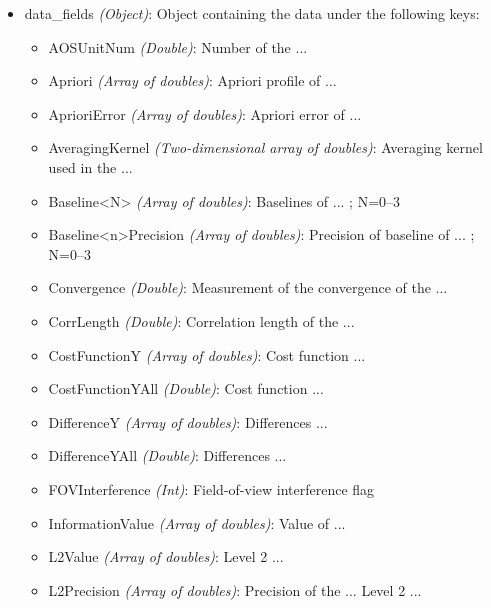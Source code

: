 \begin{itemize}
    \item data\_fields \emph{(Object)}: Object containing the data under the
        following keys:
        \begin{itemize}
            \item AOSUnitNum \emph{(Double)}: Number of the ...
            \item Apriori \emph{(Array of doubles)}: Apriori profile of ...
            \item AprioriError \emph{(Array of doubles)}: Apriori error of ...
            \item AveragingKernel \emph{(Two-dimensional array of doubles)}:
                Averaging kernel used in the ... 
            \item Baseline<N> \emph{(Array of doubles)}: Baselines of ...
                ; N=0--3
            \item Baseline<n>Precision \emph{(Array of doubles)}: Precision of
                baseline of ... ; N=0--3
            \item Convergence \emph{(Double)}: Measurement of the convergence
                of the ... 
            \item CorrLength \emph{(Double)}: Correlation length of the ...
            \item CostFunctionY \emph{(Array of doubles)}: Cost function ...
            \item CostFunctionYAll \emph{(Double)}: Cost function ...
            \item DifferenceY \emph{(Array of doubles)}: Differences ...
            \item DifferenceYAll \emph{(Double)}: Differences ...
            \item FOVInterference \emph{(Int)}: Field-of-view interference flag
            \item InformationValue \emph{(Array of doubles)}: Value of ...
            \item L2Value \emph{(Array of doubles)}: Level 2 ... 
            \item L2Precision \emph{(Array of doubles)}: Precision of the ...
                Level 2 ... 

\end{itemize}
\end{itemize}
